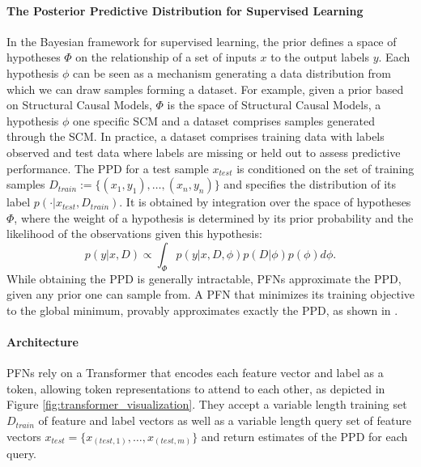 \documentclass{article}
\begin{document}
\paragraph{The Posterior Predictive Distribution for Supervised Learning} 

In the Bayesian framework for supervised learning, the prior defines a space of hypotheses $\Phi$ on the relationship of a set of inputs $x$ to the output labels $y$.
Each hypothesis $\phi$ can be seen as a mechanism generating a data distribution from which we can draw samples forming a dataset. For example, given a prior based on Structural Causal Models, $\Phi$ is the space of Structural Causal Models, a hypothesis $\phi$ one specific SCM and a dataset comprises samples generated through the SCM. In practice, a dataset comprises training data with labels observed and test data where labels are missing or held out to assess predictive performance.
The PPD for a test sample $x_{test}$ is conditioned on the set of training samples $D_{train} := \{(x_1,y_1), \dots, (x_n,y_n)\}$ and specifies the distribution of its label $p(\cdot|x_{test},D_{train})$.
It is obtained by integration over the space of hypotheses $\Phi$, where the weight of a hypothesis is determined by its prior probability and the likelihood of the observations given this hypothesis:
\begin{equation}
    p(y|x,D) \propto \int_{\Phi} p(y|x,D,\phi) p(D|\phi) p(\phi) d\phi.
    \label{eq:ppd}
\end{equation}
While obtaining the PPD is generally intractable, PFNs approximate the PPD, given any prior one can sample from.
A PFN that minimizes its training objective to the global minimum, provably approximates exactly the PPD, as shown in \cite{muller-iclr22a}.

\paragraph{Architecture} 
PFNs rely on a Transformer \citep{vaswani-neurips17a} that encodes each feature vector and label as a token, allowing token representations to attend to each other, as depicted in Figure \ref{fig:transformer_visualization}.
They accept a variable length training set $D_{train}$ of feature and label vectors as well as a variable length query set of feature vectors $x_{test} = \{x_{({test},1)}, \dots, x_{({test},m)}\}$ and return estimates of the PPD for each query.
\end{document}
